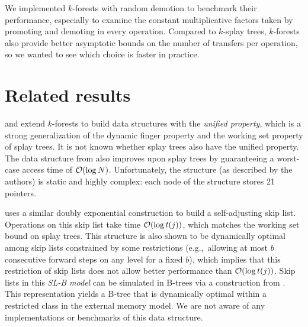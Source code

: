We implemented $k$-forests with random demotion to benchmark their performance,
especially to examine the constant multiplicative factors taken by promoting
and demoting in every operation. Compared to $k$-splay trees, $k$-forests
also provide better asymptotic bounds on the number of transfers per operation,
so we wanted to see which choice is faster in practice.

\section{Related results}
\cite{alternatives-to-splay-trees} and \cite{unified-access-bound} extend
$k$-forests to build data structures with the \emph{unified property},
which is a strong generalization of the dynamic finger property and the working
set property of splay trees.
It is not known whether splay trees also have the unified property.
The data structure from \cite{alternatives-to-splay-trees} also improves
upon splay trees by guaranteeing a worst-case access time of $\mathcal{O}(\log N)$.
Unfortunately, the structure (as described by the authors) is static and highly
complex: each node of the structure stores 21 pointers.

\cite{dynamic-optimality-for-sl} uses a similar doubly exponential construction
to build a self-adjusting skip list. Operations on this skip list take time
$\mathcal{O}(\log t(j))$, which matches the working set bound on splay trees.
This structure is also shown to be dynamically optimal among skip lists
constrained by some restrictions (e.g.,\ allowing at most $b$ consecutive
forward steps on any level for a fixed $b$), which implies that this
restriction of skip lists does not allow better performance than
$\mathcal{O}(\log t(j))$.
Skip lists in this \emph{SL-B model} can be simulated in B-trees via
a construction from \cite{exploring-duality}. This representation yields
a B-tree that is dynamically optimal within a restricted class in the external
memory model. We are not aware of any implementations or benchmarks of this
data structure.
